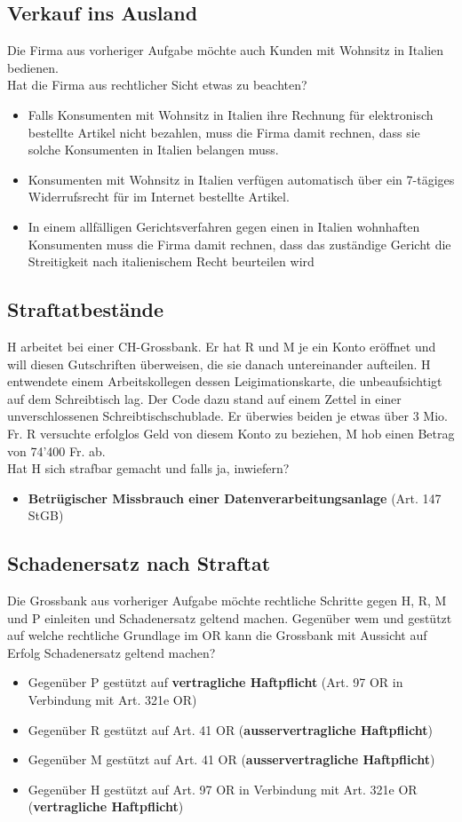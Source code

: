 \subsection{Verkauf ins Ausland}
Die Firma aus vorheriger Aufgabe möchte auch Kunden mit Wohnsitz in Italien bedienen.\\
Hat die Firma aus rechtlicher Sicht etwas zu beachten?
\begin{itemize}
	\item Falls Konsumenten mit Wohnsitz in Italien ihre Rechnung für elektronisch bestellte Artikel nicht bezahlen, muss die Firma damit rechnen, dass sie solche Konsumenten in Italien	belangen muss.
	\item Konsumenten mit Wohnsitz in Italien verfügen automatisch über ein 7-tägiges Widerrufsrecht für im Internet bestellte Artikel.
	\item In einem allfälligen Gerichtsverfahren gegen einen in Italien wohnhaften Konsumenten muss die Firma damit rechnen, dass das zuständige Gericht die Streitigkeit nach italienischem Recht beurteilen wird
\end{itemize}

\subsection{Straftatbestände}
H arbeitet bei einer CH-Grossbank. Er hat R und M je ein Konto eröffnet und will diesen Gutschriften überweisen, die sie danach untereinander aufteilen. H entwendete einem Arbeitskollegen dessen Leigimationskarte, die unbeaufsichtigt auf dem Schreibtisch lag. Der Code dazu stand auf einem Zettel in einer unverschlossenen Schreibtischschublade. Er überwies beiden je etwas über 3 Mio. Fr. R versuchte erfolglos Geld von diesem Konto zu beziehen, M hob einen Betrag von 74'400 Fr. ab.\\
Hat H sich strafbar gemacht und falls ja, inwiefern?
\begin{itemize}
	\item \textbf{Betrügischer Missbrauch einer Datenverarbeitungsanlage} (Art. 147 StGB)
\end{itemize}

\subsection{Schadenersatz nach Straftat}
Die Grossbank aus vorheriger Aufgabe möchte rechtliche Schritte gegen H, R, M und P einleiten und Schadenersatz geltend machen. Gegenüber wem und gestützt auf welche rechtliche Grundlage im OR kann die Grossbank mit Aussicht auf Erfolg Schadenersatz geltend machen?
\begin{itemize}
	\item Gegenüber P gestützt auf \textbf{vertragliche Haftpflicht} (Art. 97 OR in Verbindung mit Art. 321e OR)
	\item Gegenüber R gestützt auf Art. 41 OR (\textbf{ausservertragliche Haftpflicht})
	\item Gegenüber M gestützt auf Art. 41 OR (\textbf{ausservertragliche Haftpflicht})
	\item Gegenüber H gestützt auf Art. 97 OR in Verbindung mit Art. 321e OR (\textbf{vertragliche Haftpflicht})
\end{itemize}
